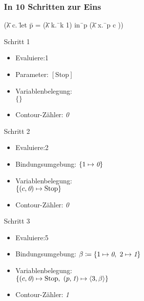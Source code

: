\documentclass{beamer}
\begin{document}
\newcommand{\Stop}{\text{Stop}}
\begin{frame}
\frametitle{In 10 Schritten zur Eins}
{\ttfamily
\begin{tabbing}
(\=λ c. \=let \=p = (\=λ k.\=\ k 1) in\=\ p (\=λ x.\=\ p c ))\\
\> \> \> \> \> \>  \>  \> 
\end{tabbing}}

\begin{overprint}
\onslide<+>
\begin{block}{Schritt 1}
\begin{itemize}
\item Evaluiere:\phantom{$\langle$}1
\item Parameter: $[\Stop]$
\item Variablenbelegung: \\
$\{\}$
\item Contour-Zähler: \textit0
\end{itemize}
\end{block}

\onslide<+>
\begin{block}{Schritt 2}
\begin{itemize}
\item Evaluiere:\phantom{$\langle$}2
\item Bindungsumgebung: $\{ 1 \mapsto \textit 0 \}$
\item Variablenbelegung: \\
$\{ (c,\textit 0) \mapsto \Stop \}$
\item Contour-Zähler: \textit0
\end{itemize}
\end{block}

\onslide<+>
\begin{block}{Schritt 3}
\begin{itemize}
\item Evaluiere:\phantom{$\langle$}5
\item Bindungsumgebung: $\beta \coloneqq \{ 1 \mapsto \textit 0,\ 2 \mapsto \textit 1 \}$
\item Variablenbelegung: \\
$\{ (c,\textit 0) \mapsto \Stop,\ (p,\textit 1) \mapsto \langle 3,\beta\rangle\}$
\item Contour-Zähler: \textit1
\end{itemize}
\end{block}


\end{overprint}
\end{frame}
\end{document}
